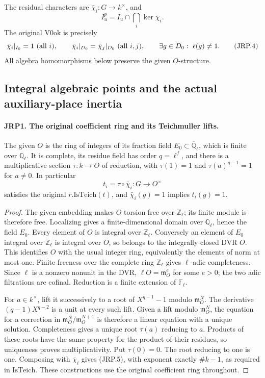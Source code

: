 The residual characters are \(\bar\chi_i:G\to k^\times\), and
\[
 I^p_u=I_u\cap\bigcap_i\ker\bar\chi_i.
\]
The original \(\mathrm{V0ok}\) is precisely
\[
 \bar\chi_i|_{I_0}=1\ (\hbox{all }i),\qquad
 \bar\chi_i|_{D_0}=\bar\chi_j|_{D_0}\ (\hbox{all }i,j),\qquad
 \exists g\in D_0:\ \bar\epsilon(g)\ne1.
 \tag{JRP.4}
\]
All algebra homomorphisms below preserve the given \(O\)-structure.

\subsection{Integral algebraic points and the actual auxiliary-place inertia}

\paragraph{JRP1. The original coefficient ring and its Teichmuller lifts.}
\label{claim:JRP1}
The given \(O\) is the ring of integers of its fraction field
\(E_0\subset\overline{\mathbb Q}_\ell\), which is finite over
\(\mathbb Q_\ell\).  It is complete, its residue field has order
\(q=\ell^f\), and there is a multiplicative section
\(\tau:k\to O\) of reduction, with \(\tau(1)=1\) and
\(\tau(a)^{q-1}=1\) for \(a\ne0\).  In particular
\[
 t_i=\tau\circ\bar\chi_i:G\longrightarrow O^\times
 \tag{JRP.5}
\]
satisfies the original \(r.\mathrm{IsTeich}(t)\), and
\(\bar\chi_i(g)=1\) implies \(t_i(g)=1\).
\begin{proof}
The given embedding makes \(O\) torsion free over
\(\mathbb Z_\ell\); its finite module is therefore free.  Localizing
gives a finite-dimensional domain over \(\mathbb Q_\ell\), hence
the field \(E_0\).  Every element of \(O\) is integral over
\(\mathbb Z_\ell\).  Conversely an element of \(E_0\) integral
over \(\mathbb Z_\ell\) is integral over \(O\), so belongs to the
integrally closed DVR \(O\).  This identifies \(O\) with the
usual integer ring, equivalently the elements of norm at most one.
Finite freeness over the complete ring \(\mathbb Z_\ell\) gives
\(\ell\)-adic completeness.  Since \(\ell\) is a nonzero
nonunit in the DVR, \(\ell O=\mathfrak m_O^e\) for some
\(e>0\); the two adic filtrations are cofinal.  Reduction is a
finite extension of \(\mathbb F_\ell\).

For \(a\in k^\times\), lift it successively to a root of
\(X^{q-1}-1\) modulo \(\mathfrak m_O^N\).  The derivative
\((q-1)X^{q-2}\) is a unit at every such lift.  Given a lift
modulo \(\mathfrak m_O^N\), the equation for a correction in
\(\mathfrak m_O^N/\mathfrak m_O^{N+1}\) is therefore a linear
equation with a unique solution.  Completeness gives a unique root
\(\tau(a)\) reducing to \(a\).  Products of these roots have the
same property for the product of their residues, so uniqueness
proves multiplicativity.  Put \(\tau(0)=0\).  The root reducing
to one is one.  Composing with \(\bar\chi_i\) gives (JRP.5),
with exponent exactly \(\#k-1\), as required in
\(\mathrm{IsTeich}\).  These constructions use the original
coefficient ring throughout.
\end{proof}


